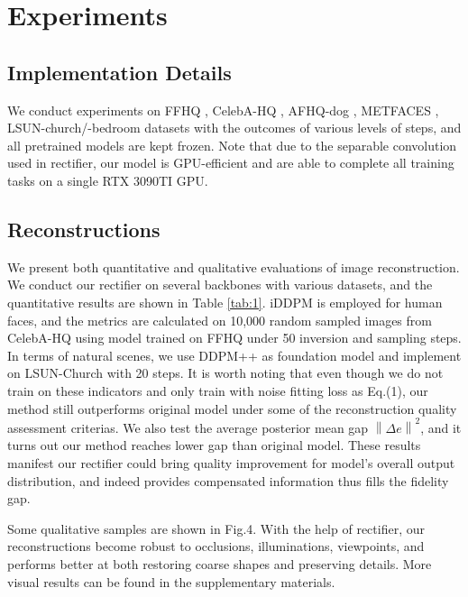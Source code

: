\documentclass[letterpaper]{article} %
\begin{document}
\section{Experiments}

\subsection{Implementation Details}
We conduct experiments on FFHQ \cite{karras2019style}, CelebA-HQ \cite{karras2017progressive}, AFHQ-dog \cite{choi2020stargan}, METFACES \cite{karras2020training}, LSUN-church/-bedroom \cite{yu2015lsun} datasets with the outcomes of various levels of steps, and all pretrained models are kept frozen. Note that due to the separable convolution used in rectifier, our model is GPU-efficient and are able to complete all training tasks on a single RTX 3090TI GPU.


\subsection{Reconstructions}
We present both quantitative and qualitative evaluations of image reconstruction. 
We conduct our rectifier on several backbones with various datasets, and the quantitative results are shown in Table \ref{tab:1}. 
iDDPM \cite{nichol2021improved} is employed for human faces, and the metrics are calculated on 10,000 random sampled images from CelebA-HQ using model trained on FFHQ under 50 inversion and sampling steps. In terms of natural scenes, we use DDPM++ \cite{song2020score} as foundation model and implement on LSUN-Church \cite{yu2015lsun} with 20 steps.
It is worth noting that even though we do not train on these indicators and only train with noise fitting loss as Eq.(1), our method still outperforms original model under some of the reconstruction quality assessment criterias. We also test the average posterior mean gap $\left \| \Delta e \right \| ^2$, and it turns out our method reaches lower gap than original model. These results manifest our rectifier could bring quality improvement for model's overall output distribution, and indeed provides compensated information thus fills the fidelity gap.

Some qualitative samples are shown in Fig.4. With the help of rectifier, our reconstructions become robust to occlusions, illuminations, viewpoints, and performs better at both restoring coarse shapes and  preserving details. More visual results can be found in the supplementary materials.
\end{document}
